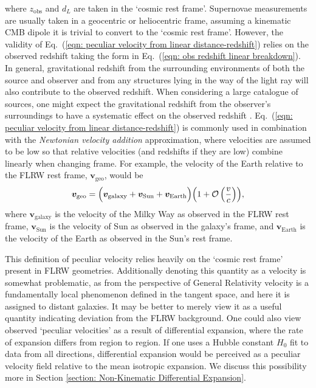 \documentclass[a4paper,12pt]{report}
\renewcommand{\vec}[1]{\ensuremath{\bm{#1}}}
\renewcommand{\eqref}[1]{Eq.~({#1})}
\begin{document}
where $z_\text{obs}$ and $d_L$ are taken in the `cosmic rest frame'. Supernovae measurements are usually taken in a geocentric or heliocentric frame, assuming a kinematic CMB dipole it is trivial to convert to the `cosmic rest frame'. However, the validity of \eqref{\ref{eqn: peculiar velocity from linear distance-redshift}} relies on the observed redshift taking the form in \eqref{\ref{eqn: obs redshift linear breakdown}}. In general, gravitational redshift from the surrounding environments of both the source and observer and from any structures lying in the way of the light ray will also contribute to the observed redshift. When considering a large catalogue of sources, one might expect the gravitational redshift from the observer's surroundings to have a systematic effect on the observed redshift \cite{RN232}. \eqref{\ref{eqn: peculiar velocity from linear distance-redshift}} is commonly used in combination with the \textit{Newtonian velocity addition} approximation, where velocities are assumed to be low so that relative velocities (and redshifts if they are low) combine linearly when changing frame. For example, the velocity of the Earth relative to the FLRW rest frame, $\vec{v}_\text{geo}$, would be
\begin{equation}
    \vec{v}_\text{geo} = \Bigl(\vec{v}_\text{galaxy} + \vec{v}_\text{Sun} + \vec{v}_\text{Earth}\Bigr)\Bigl(1 + \mathcal{O}\left(\frac{v}{c}\right)\Bigr),
\end{equation}
where $\vec{v}_\text{galaxy}$ is the velocity of the Milky Way as observed in the FLRW rest frame, $\vec{v}_\text{Sun}$ is the velocity of Sun as observed in the galaxy's frame, and $\vec{v}_\text{Earth}$ is the velocity of the Earth as observed in the Sun's rest frame.

This definition of peculiar velocity relies heavily on the `cosmic rest frame' present in FLRW geometries. Additionally denoting this quantity as a velocity is somewhat problematic, as from the perspective of General Relativity velocity is a fundamentally local phenomenon defined in the tangent space, and here it is assigned to distant galaxies. It may be better to merely view it as a useful quantity indicating deviation from the FLRW background. One could also view observed `peculiar velocities' as a result of differential expansion, where the rate of expansion differs from region to region. If one uses a Hubble constant $H_0$ fit to data from all directions, differential expansion would be perceived as a peculiar velocity field relative to the mean isotropic expansion. We discuss this possibility more in Section \ref{section: Non-Kinematic Differential Expansion}.
\end{document}
